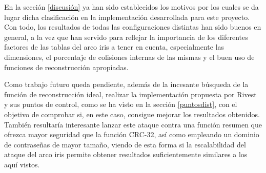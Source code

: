 \documentclass[12pt,spanish,listoffigures,listoftables,listofalgorithms]{tfgetsinf}
\begin{document}
En la sección \ref{discusión} ya han sido establecidos los motivos por los cuales se da lugar dicha clasificación en la implementación desarrollada para este proyecto. Con todo, los resultados de todas las configuraciones distintas han sido buenos en general, a la vez que han servido para reflejar la importancia de los diferentes factores de las tablas del arco iris a tener en cuenta, especialmente las dimensiones, el porcentaje de colisiones internas de las mismas y el buen uso de funciones de reconstrucción apropiadas.

Como trabajo futuro queda pendiente, además de la incesante búsqueda de la función de reconstrucción ideal, realizar la implementación propuesta por Rivest \cite{rivest} y sus puntos de control, como se ha visto en la sección \ref{puntosdist}, con el objetivo de comprobar si, en este caso, consigue mejorar los resultados obtenidos. También resultaría interesante lanzar este ataque contra una función resumen que ofrezca mayor seguridad que la función CRC-32, así como empleando un dominio de contraseñas de mayor tamaño, viendo de esta forma si la escalabilidad del ataque del arco iris permite obtener resultados suficientemente similares a los aquí vistos.
\end{document}
